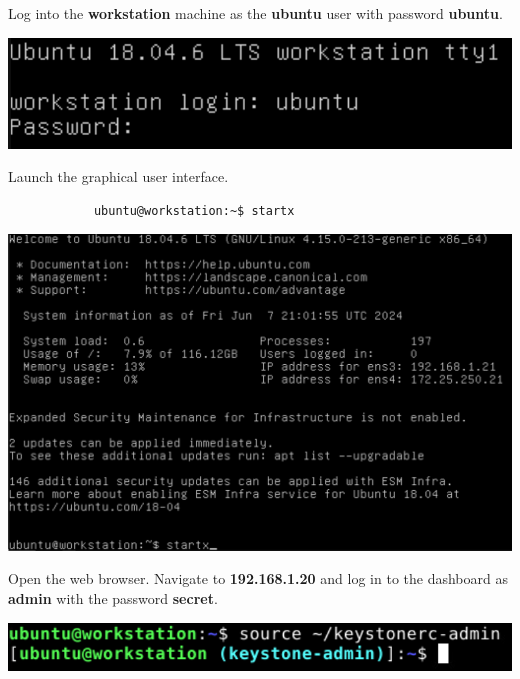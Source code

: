 \documentclass[letterpaper, 12pt]{article}
\begin{document}
\begin{enumerate}
    \begin{labstep}
        Log into the \textbf{workstation} machine as the \textbf{ubuntu} user with password \textbf{ubuntu}.

        \begin{center}
            \includegraphics[width=\linewidth]{images/part1/step1.png}
        \end{center}
    \end{labstep}

    \begin{labstep}
        Launch the graphical user interface.
        \begin{lstlisting}
            ubuntu@workstation:~$ startx
        \end{lstlisting}

        \begin{center}
            \includegraphics[width=\linewidth]{images/part1/step2.png}
        \end{center}
    \end{labstep}

    \begin{labstep}
        Open the web browser.
        Navigate to \textbf{192.168.1.20} and log in to the dashboard as \textbf{admin} with the password \textbf{secret}.

        \begin{center}
            \includegraphics[scale=0.5]{images/part1/step3.png}
        \end{center}
    \end{labstep}


\end{enumerate}
\end{document}
